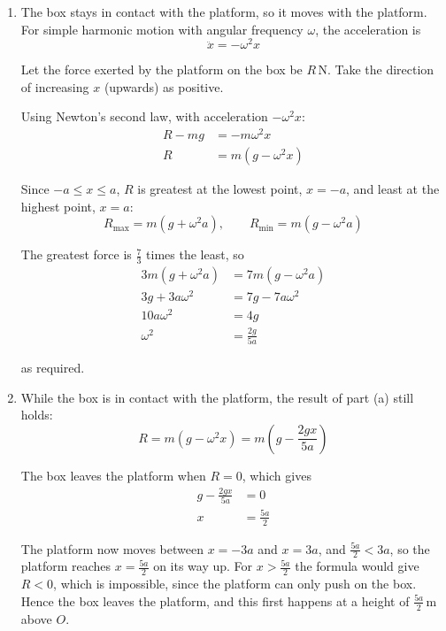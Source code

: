 \documentclass[leqno]{article}
\begin{document}
\begin{enumerate}[
  label=\textbf{\arabic*.},
  leftmargin=*,
  topsep=0pt,
  partopsep=0pt,
  parsep=0pt
]
\vspace*{10pt}

\begin{djsSolution}
\begin{enumerate}[label=\textbf{(\alph*)}, start=1]
\item The box stays in contact with the platform, so it moves with the platform. For simple harmonic motion with angular frequency \(\omega\), the acceleration is
\[
\ddot{x}=-\omega^2x
\]

Let the force exerted by the platform on the box be \(R\,\mathrm{N}\). Take the direction of increasing \(x\) (upwards) as positive.

Using Newton's second law, with acceleration \(-\omega^2x\):
\begin{align*}
R-mg&=-m\omega^2x\\
R&=m\left(g-\omega^2x\right)
\end{align*}

Since \(-a\le x\le a\), \(R\) is greatest at the lowest point, \(x=-a\), and least at the highest point, \(x=a\):
\[
R_{\max}=m\left(g+\omega^2a\right),\qquad R_{\min}=m\left(g-\omega^2a\right)
\]

The greatest force is \(\frac{7}{3}\) times the least, so
\begin{align*}
3m\left(g+\omega^2a\right)&=7m\left(g-\omega^2a\right)\\
3g+3a\omega^2&=7g-7a\omega^2\\
10a\omega^2&=4g\\
\omega^2&=\frac{2g}{5a}
\end{align*}

as required.

\item While the box is in contact with the platform, the result of part (a) still holds:
\[
R=m\left(g-\omega^2x\right)=m\left(g-\frac{2gx}{5a}\right)
\]

The box leaves the platform when \(R=0\), which gives
\begin{align*}
g-\frac{2gx}{5a}&=0\\
x&=\frac{5a}{2}
\end{align*}

The platform now moves between \(x=-3a\) and \(x=3a\), and \(\frac{5a}{2}<3a\), so the platform reaches \(x=\frac{5a}{2}\) on its way up. For \(x>\frac{5a}{2}\) the formula would give \(R<0\), which is impossible, since the platform can only push on the box. Hence the box leaves the platform, and this first happens at a height of \(\frac{5a}{2}\,\mathrm{m}\) above \(O\).


\end{enumerate}
\end{djsSolution}
\end{enumerate}
\end{document}

